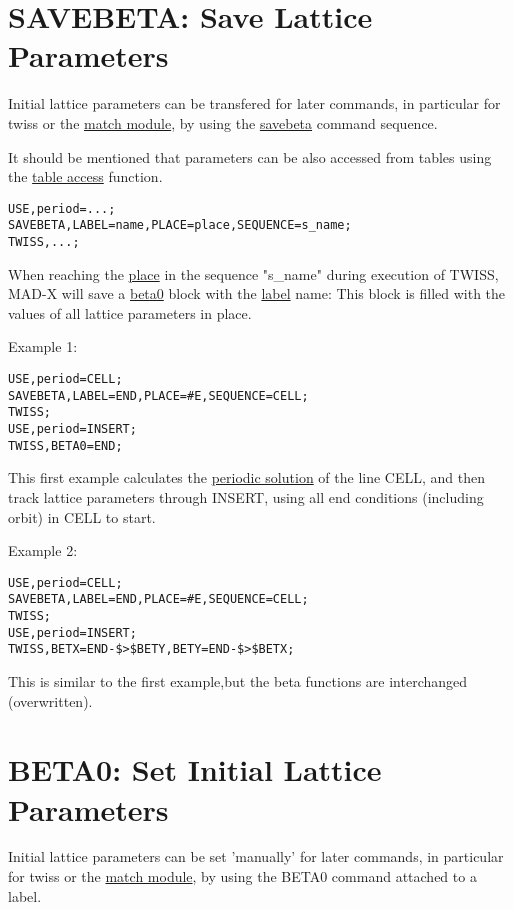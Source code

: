 \section{SAVEBETA: Save Lattice Parameters}

Initial lattice parameters can be transfered for later commands, in particular for twiss or the \href{../match/match.html}{match module}, by using the \href{../control/general.html#savebeta}{savebeta} command sequence. 

It should be mentioned that parameters can be also accessed from tables using the \href{../Introduction/expression.html#table}{table access} function.
\begin{verbatim}
USE,period=...;
SAVEBETA,LABEL=name,PLACE=place,SEQUENCE=s_name;
TWISS,...;
\end{verbatim}

When reaching the \href{../control/general.html#place}{place} in the sequence "s\_name" during execution of TWISS, MAD-X will save a \hyperlink{beta0}{beta0} block with the \href{../Introduction/label.html}{label} name: This block is filled with the values of all lattice parameters in place. 

Example 1: 
\begin{verbatim}
USE,period=CELL;
SAVEBETA,LABEL=END,PLACE=#E,SEQUENCE=CELL;
TWISS;
USE,period=INSERT;
TWISS,BETA0=END;
\end{verbatim}

This first example calculates the \hyperlink{periodic}{periodic solution} of the line CELL, and then track lattice parameters through INSERT, using all end conditions (including orbit) in CELL to start. 

Example 2: 
\begin{verbatim}
USE,period=CELL;
SAVEBETA,LABEL=END,PLACE=#E,SEQUENCE=CELL;
TWISS;
USE,period=INSERT;
TWISS,BETX=END-$>$BETY,BETY=END-$>$BETX;
\end{verbatim}

This is similar to the first example,but the beta functions are interchanged (overwritten).  

\section{BETA0: Set Initial Lattice Parameters}

Initial lattice parameters can be set 'manually' for later commands, in particular for twiss or the \href{../match/match.html}{match module}, by using the BETA0 command attached to a label. 

